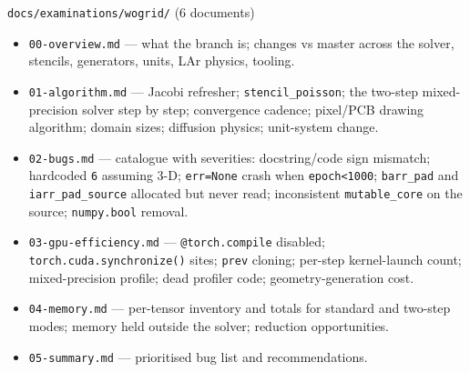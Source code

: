 \documentclass[10pt,aspectratio=169]{beamer}
\newcommand{\ti}[1]{\texttt{\footnotesize #1}}
\begin{document}
\begin{frame}[allowframebreaks]{\texttt{docs/examinations/wogrid/} (6 documents)}
  \begin{itemize}\small
  \item \ti{00-overview.md} --- what the branch is; changes vs master across the solver,
        stencils, generators, units, LAr physics, tooling.
  \item \ti{01-algorithm.md} --- Jacobi refresher; \ti{stencil\_poisson};
        the two-step mixed-precision solver step by step; convergence cadence; pixel/PCB
        drawing algorithm; domain sizes; diffusion physics; unit-system change.
  \item \ti{02-bugs.md} --- catalogue with severities: docstring/code sign mismatch;
        hardcoded \ti{6} assuming 3-D; \ti{err=None} crash when \ti{epoch<1000};
        \ti{barr\_pad} and \ti{iarr\_pad\_source} allocated but never read;
        inconsistent \ti{mutable\_core} on the source; \ti{numpy.bool} removal.
  \item \ti{03-gpu-efficiency.md} --- \ti{@torch.compile} disabled;
        \ti{torch.cuda.synchronize()} sites; \ti{prev} cloning; per-step kernel-launch
        count; mixed-precision profile; dead profiler code; geometry-generation cost.
  \item \ti{04-memory.md} --- per-tensor inventory and totals for standard and two-step
        modes; memory held outside the solver; reduction opportunities.
  \item \ti{05-summary.md} --- prioritised bug list and recommendations.
  \end{itemize}
\end{frame}
\end{document}

